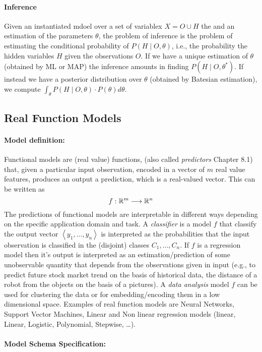 \paragraph{Inference}
Given an instantiated mdoel over a set of variablex $X=O \cup H$ the
and an estimation of the parameters $\theta$, the problem of inference
is the problem of estimating the conditional probability of $P(H\mid
O,\theta)$, i.e., the probability the hidden variables $H$ given the
observations $O$. If we have a unique estimation of $\theta$ (obtained
by ML or MAP) the inference amounts in finding $P(H\mid
O,\theta^*)$. If instead we have a posterior distribution over
$\theta$ (obtained by Batesian estimation), we compute $\int_{\theta}
P(H\mid O,\theta)\cdot P(\theta) d\theta $.

\subsection{Real Function Models}

\paragraph{Model definition:}
Functional models are (real value) functions, (also called
\emph{predictors} \cite{deisenroth2020mathematics} Chapter 8.1) that,
given a particular input observation, encoded in a vector of $m$ real
value features, produces an output a prediction, which is a
real-valued vector. This can be written
as
$$
f :\mathbb{R}^m \longrightarrow \mathbb{R}^n
$$
The predictions of functional models are interpretable in different
ways depending on the specific application domain and task.
A \emph{classifier} is a model $f$  that classify the output vector
$\left<y_1,\dots,y_n\right>$ is interpreted as the probabilities that
the input observation is classified in the (disjoint) classes
$C_1,\dots,C_n$.  If $f$ is a regression model then it's output is
interpreted as an estimation/prediction of some unobservable quantity
that depends from the observations given in input (e.g., to predict
future stock market trend on the basis of historical data, the
distance of a robot from the objects on the basis of a pictures).
A \emph{data analysis} model $f$ can be used for clustering the data
or for embedding/encoding them in a low dimensional space.  
Examples of real function models are Neural Networks, Support Vector
Machines, Linear and Non linear regression models (linear, Linear,
Logistic, Polynomial, Stepwise, \dots). 

\paragraph{Model Schema Specification:}

